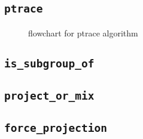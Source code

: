 \subsection{\texttt{ptrace}}
\begin{figure}[h]
  \centering
  
  \caption{flowchart for ptrace algorithm}
  \label{fig:ptrace-dig}
\end{figure}

\subsection{\texttt{is\_subgroup\_of}}

\subsection{\texttt{project\_or\_mix}}

\subsection{\texttt{force\_projection}}
